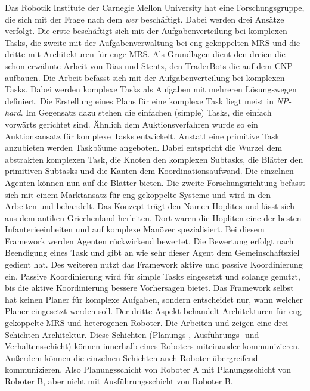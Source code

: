 Das Robotik Institute der Carnegie Mellon University hat eine Forschungsgruppe, die sich mit der Frage nach dem \textit{wer} beschäftigt. Dabei werden drei Ansätze verfolgt. Die erste beschäftigt sich mit der Aufgabenverteilung bei komplexen Tasks, die zweite mit der Aufgabenverwaltung bei eng-gekoppelten MRS und die dritte mit Architekturen für enge MRS. Als Grundlagen dient den dreien die schon erwähnte Arbeit von Dias und Stentz, den TraderBots\cite{dias2000market} die auf dem CNP aufbauen. Die Arbeit \cite{zlot2005complex} befasst sich mit der Aufgabenverteilung bei komplexen Tasks. Dabei werden komplexe Tasks als Aufgaben mit mehreren Lösungswegen definiert. Die Erstellung eines Plans für eine komplexe Task liegt meist in \textit{NP-hard}. Im Gegensatz dazu stehen die einfachen (simple) Tasks, die einfach vorwärts gerichtet sind. Ähnlich dem Auktionsverfahren wurde so ein Auktionsansatz für komplexe Tasks entwickelt. Anstatt eine primitive Task anzubieten werden Taskbäume angeboten. Dabei entspricht die Wurzel dem abstrakten komplexen Task, die Knoten den komplexen Subtasks, die Blätter den primitiven Subtasks und die Kanten dem Koordinationsaufwand. Die einzelnen Agenten können nun auf die Blätter bieten. Die zweite Forschungsrichtung befasst sich mit einem Marktansatz für eng-gekoppelte Systeme und wird in den Arbeiten \cite{kalra2004hoplites} und \cite{kalra2005hoplites} behandelt. Das Konzept trägt den Namen Hoplites und lässt sich aus dem antiken Griechenland herleiten. Dort waren die Hopliten eine der besten Infanterieeinheiten und auf komplexe Manöver spezialisiert. Bei diesem Framework werden Agenten rückwirkend bewertet. Die Bewertung erfolgt nach Beendigung eines Task und gibt an wie sehr dieser Agent dem Gemeinschaftsziel gedient hat. Des weiteren nutzt das Framework aktive und passive Koordinierung ein. Passive Koordinierung wird für simple Tasks eingesetzt und solange genutzt, bis die aktive Koordinierung bessere Vorhersagen bietet. Das Framework selbst hat keinen Planer für komplexe Aufgaben, sondern entscheidet nur, wann welcher Planer eingesetzt werden soll. Der dritte Aspekt behandelt Architekturen für eng-gekoppelte MRS und heterogenen Roboter. Die Arbeiten \cite{simmons2001first} und \cite{simmons2002layered} zeigen eine drei Schichten Architektur. Diese Schichten (Planungs-, Ausführungs- und Verhaltensschicht) können innerhalb eines Roboters miteinander kommunizieren. Außerdem können die einzelnen Schichten auch Roboter übergreifend kommunizieren. Also Planungsschicht von Roboter A mit Planungsschicht von Roboter B, aber nicht mit Ausführungsschicht von Roboter B.\cite{lundh2006plan} 

